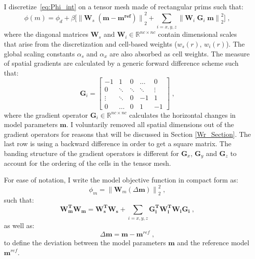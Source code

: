 I discretize~\ref{eq:Phi_int} on a tensor mesh made of rectangular prims such that:
 \begin{equation} \label{eq:Phi_disc}
\phi(m) =  \phi_d + \beta \Big [ {\| \mathbf{W}_s \;( \mathbf{m - m^{ref}})\|}^2_2  + \sum_{i = x,y,z}  {\|   \mathbf{W}_i  \; \mathbf{G}_i \; \mathbf{m}\|}^2_2  \Big ]\;,
\end{equation}
where the diagonal matrices $\mathbf{W}_s$ and $\mathbf{W}_i \in \mathbb{R}^{nc \times nc}$ contain dimensional scales that arise from the  discretization and cell-based weights (${w}_s(r)$, ${w}_i(r)$).
The global scaling constants $\alpha_s$ and $\alpha_x$ are also absorbed as cell weights. 
The measure of spatial gradients are calculated by a generic forward difference scheme such that:
\begin{equation}\label{1D_Grad}
\mathbf{G}_i = 
		\begin{bmatrix}
			-1 		& 		1	&  	0		& \dots  		&  0 \\
			0 		& 	\ddots	&  	 \ddots	&  \ddots  	&  \vdots \\
			\vdots	&  		 \ddots	&  0	& -1 &  1\\
			0 		& 	\dots		& 		0	& 1 &  -1 
		 \end{bmatrix}\;,
\end{equation}
where the gradient operator $\mathbf{G}_i \in \mathbb{R}^{nc \times nc}$ calculates the horizontal changes in model parameters $\mathbf{m}$. 
I voluntarily removed all spatial dimensions out of the gradient operators for reasons that will be discussed in Section \ref{Wr_Section}.
The last row is using a backward difference in order to get a square matrix.
The banding structure of the gradient operators is different for $\mathbf{G}_x$, $\mathbf{G}_y$ and $\mathbf{G}_z$ to account for the ordering of the cells in the tensor mesh. 

For ease of notation, I write the model objective function in compact form as:
\begin{equation}
\phi_m = {\|\mathbf{W}_m\left(\Delta \mathbf{m} \right)\|}_2^2 \;,
\end{equation}
such that:
\begin{equation*}
\mathbf{W_\text{m}^TW_\text{m}} = \mathbf{W_\text{s}^TW_\text{s}} +  \sum_{i = x,y,z} \mathbf{G_\text{i}^TW_\text{i}^TW_\text{i}G_\text{i}} \;,
\end{equation*}
as well as:
\begin{equation*}
\Delta \mathbf{m} = \mathbf{m}-\mathbf{m}^{ref}\;,
\end{equation*}
to define the deviation between the model parameters $\mathbf{m}$ and the reference model $\mathbf{m}^{ref}$.
